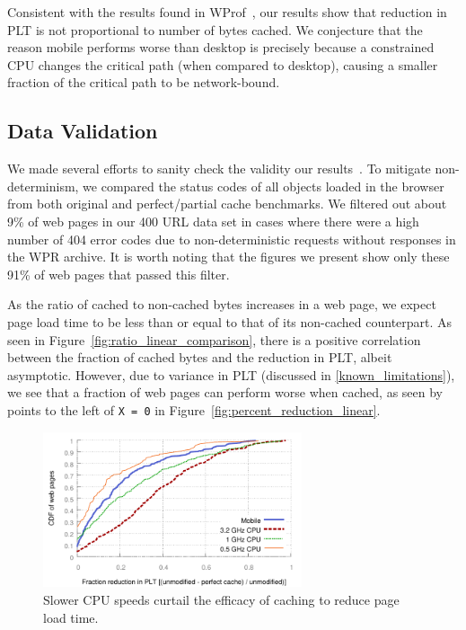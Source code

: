 Consistent with the results found in WProf~\cite{wang2013demystifying}, our results show that reduction in PLT is not proportional to number of bytes cached. We conjecture that the reason mobile performs worse than desktop is precisely because a constrained CPU changes the critical path (when compared to desktop), causing a smaller fraction of the critical path to be network-bound. 


\subsection{Data Validation}
\label{subsec:validation}
We made several efforts to sanity check the validity our results~\cite{sanity-checks}. To mitigate non-determinism, we compared the status codes of all objects loaded in the browser from both original and perfect/partial cache benchmarks. We filtered out about 9\% of web pages in our 400 URL data set in cases where there were a high number of 404 error codes due to non-deterministic requests without responses in the WPR archive. It is worth noting that the figures we present show only these 91\% of web pages that passed this filter.

As the ratio of cached to non-cached bytes increases in a web page, we expect page load time to be less than or equal to that of its non-cached counterpart. As seen in Figure~\ref{fig:ratio_linear_comparison}, there is a positive correlation between the fraction of cached bytes and the reduction in PLT, albeit asymptotic.
However, due to variance in PLT (discussed in \ref{known_limitations}), we see that a fraction of web pages can perform worse when cached, as seen by points to the left of \texttt{X = 0} in Figure~\ref{fig:percent_reduction_linear}.



\begin{figure}[t]
    \includegraphics[width=3in]{../graphs/percent_plt_reduction/percent_reduction_linear_CPU_comparison.pdf}
    \caption[]{\label{fig:plt_cpu_comparison}Slower CPU speeds curtail the efficacy of caching to reduce page load time.}
\end{figure}
